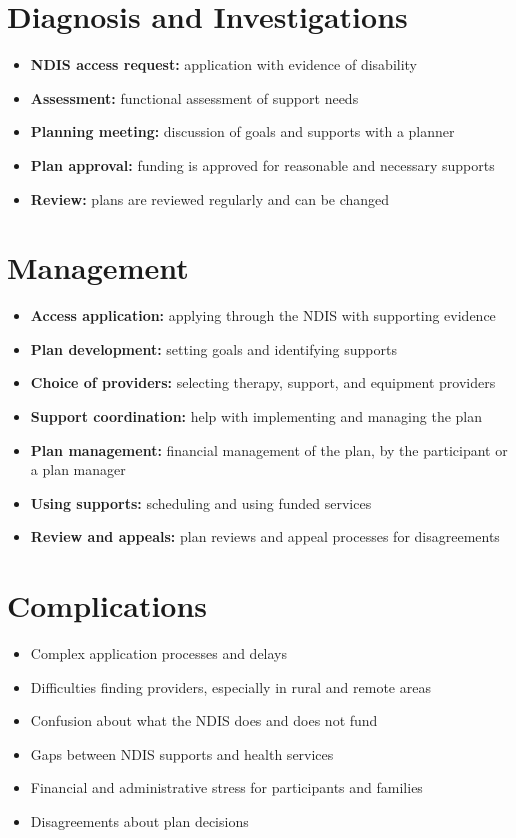 \section*{Diagnosis and Investigations}
\begin{itemize}
    \item \textbf{NDIS access request:} application with evidence of disability
    \item \textbf{Assessment:} functional assessment of support needs
    \item \textbf{Planning meeting:} discussion of goals and supports with a planner
    \item \textbf{Plan approval:} funding is approved for reasonable and necessary supports
    \item \textbf{Review:} plans are reviewed regularly and can be changed
\end{itemize}

\section*{Management}
\begin{itemize}
    \item \textbf{Access application:} applying through the NDIS with supporting evidence
    \item \textbf{Plan development:} setting goals and identifying supports
    \item \textbf{Choice of providers:} selecting therapy, support, and equipment providers
    \item \textbf{Support coordination:} help with implementing and managing the plan
    \item \textbf{Plan management:} financial management of the plan, by the participant or a plan manager
    \item \textbf{Using supports:} scheduling and using funded services
    \item \textbf{Review and appeals:} plan reviews and appeal processes for disagreements
\end{itemize}

\section*{Complications}
\begin{itemize}
    \item Complex application processes and delays
    \item Difficulties finding providers, especially in rural and remote areas
    \item Confusion about what the NDIS does and does not fund
    \item Gaps between NDIS supports and health services
    \item Financial and administrative stress for participants and families
    \item Disagreements about plan decisions
\end{itemize}

